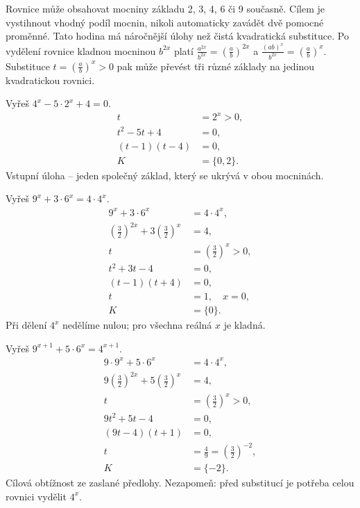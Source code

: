 \documentclass[11pt,a4paper]{article}
\begin{document}
Rovnice může obsahovat mocniny základu 2, 3, 4, 6 či 9 současně. Cílem je vystihnout vhodný podíl mocnin, nikoli automaticky zavádět dvě pomocné proměnné. Tato hodina má náročnější úlohy než čistá kvadratická substituce.
Po vydělení rovnice kladnou mocninou $b^{2x}$ platí $\frac{a^{2x}}{b^{2x}}=(\frac ab)^{2x}$ a $\frac{(ab)^x}{b^{2x}}=(\frac ab)^x$. Substituce $t=(\frac ab)^x>0$ pak může převést tři různé základy na jedinou kvadratickou rovnici.
\begin{prikladReseniBox}[title={Příklad 1}]
Vyřeš $4^x-5\cdot2^x+4=0$.
\tcblower
\[
\begin{aligned}t&=2^x>0,\\t^2-5t+4&=0,\\(t-1)(t-4)&=0,\\K&=\{0,2\}.\end{aligned}
\]
Vstupní úloha – jeden společný základ, který se ukrývá v obou mocninách.
\end{prikladReseniBox}
\begin{prikladReseniBox}[title={Příklad 2}]
Vyřeš $9^x+3\cdot6^x=4\cdot4^x$.
\tcblower
\[
\begin{aligned}9^x+3\cdot6^x&=4\cdot4^x,\\\left(\frac{3}{2}\right)^{2x}+3\left(\frac{3}{2}\right)^x&=4,\\t&=\left(\frac{3}{2}\right)^x>0,\\t^2+3t-4&=0,\\(t-1)(t+4)&=0,\\t&=1,\quad x=0,\\K&=\{0\}.\end{aligned}
\]
Při dělení $4^x$ nedělíme nulou; pro všechna reálná $x$ je kladná.
\end{prikladReseniBox}
\begin{prikladReseniBox}[title={Příklad 3}]
Vyřeš $9^{x+1}+5\cdot6^x=4^{x+1}$.
\tcblower
\[
\begin{aligned}9\cdot9^x+5\cdot6^x&=4\cdot4^x,\\9\left(\frac{3}{2}\right)^{2x}+5\left(\frac{3}{2}\right)^x&=4,\\t&=\left(\frac{3}{2}\right)^x>0,\\9t^2+5t-4&=0,\\(9t-4)(t+1)&=0,\\t&=\frac{4}{9}=\left(\frac{3}{2}\right)^{-2},\\K&=\{-2\}.\end{aligned}
\]
Cílová obtížnost ze zaslané předlohy. Nezapomeň: před substitucí je potřeba celou rovnici vydělit $4^x$.
\end{prikladReseniBox}
\end{document}
